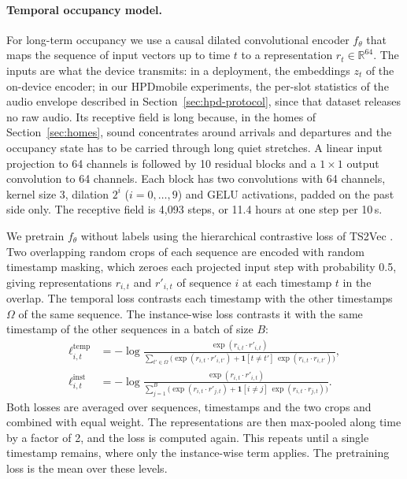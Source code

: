 \documentclass[11pt]{article}
\begin{document}
\paragraph{Temporal occupancy model.} For long-term occupancy we use a causal dilated convolutional encoder $f_\theta$ that maps the sequence of input vectors up to time $t$ to a representation $r_t \in \mathbb{R}^{64}$. The inputs are what the device transmits: in a deployment, the embeddings $z_t$ of the on-device encoder; in our HPDmobile experiments, the per-slot statistics of the audio envelope described in Section~\ref{sec:hpd-protocol}, since that dataset releases no raw audio. Its receptive field is long because, in the homes of Section~\ref{sec:homes}, sound concentrates around arrivals and departures and the occupancy state has to be carried through long quiet stretches. A linear input projection to 64 channels is followed by 10 residual blocks and a $1\times1$ output convolution to 64 channels. Each block has two convolutions with 64 channels, kernel size 3, dilation $2^i$ ($i = 0, \dots, 9$) and GELU activations, padded on the past side only. The receptive field is 4,093 steps, or 11.4 hours at one step per 10\,s.

We pretrain $f_\theta$ without labels using the hierarchical contrastive loss of TS2Vec \citep{yue2022ts2vec}. Two overlapping random crops of each sequence are encoded with random timestamp masking, which zeroes each projected input step with probability 0.5, giving representations $r_{i,t}$ and $r'_{i,t}$ of sequence $i$ at each timestamp $t$ in the overlap. The temporal loss contrasts each timestamp with the other timestamps $\Omega$ of the same sequence. The instance-wise loss contrasts it with the same timestamp of the other sequences in a batch of size $B$:
\begin{align}
\ell^{\mathrm{temp}}_{i,t} &= -\log \frac{\exp(r_{i,t}\cdot r'_{i,t})}{\sum_{t'\in\Omega}\big(\exp(r_{i,t}\cdot r'_{i,t'}) + \mathbf{1}[t\neq t']\,\exp(r_{i,t}\cdot r_{i,t'})\big)},
\label{eq:temp}\\
\ell^{\mathrm{inst}}_{i,t} &= -\log \frac{\exp(r_{i,t}\cdot r'_{i,t})}{\sum_{j=1}^{B}\big(\exp(r_{i,t}\cdot r'_{j,t}) + \mathbf{1}[i\neq j]\,\exp(r_{i,t}\cdot r_{j,t})\big)}.
\label{eq:inst}
\end{align}
Both losses are averaged over sequences, timestamps and the two crops and combined with equal weight. The representations are then max-pooled along time by a factor of 2, and the loss is computed again. This repeats until a single timestamp remains, where only the instance-wise term applies. The pretraining loss is the mean over these levels.
\end{document}
